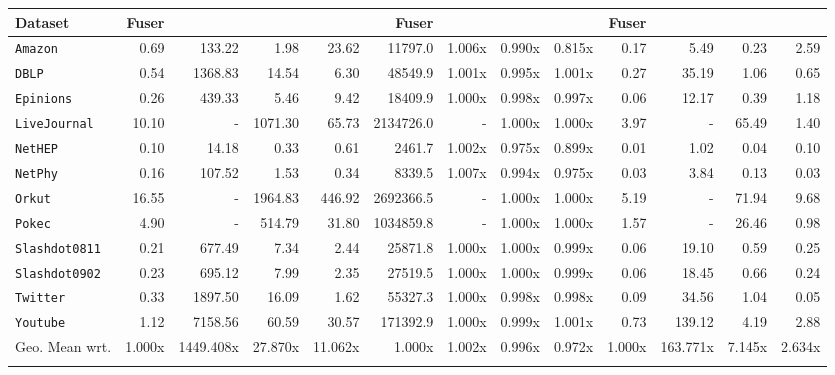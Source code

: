 \documentclass[10pt,journal,compsoc]{IEEEtran}
\newcommand\acro{{\sc{HyperFuseR\xspace}\xspace}\xspace}
\begin{document}
\begin{table}
{\begin{tabular}{l|rrrr|rrrr|rrrr}
Dataset      & {\sc Fuser} &         &         &         & {\sc Fuser} &         &         &         & {\sc Fuser} &       &       &      \\
\midrule
{\tt Amazon}       &       0.69 &  133.22 &    1.98 &  23.62 &    11797.0 &  1.006x &  0.990x &  0.815x &       0.17 &   5.49 &  0.23 & 2.59 \\
{\tt DBLP }         &       0.54 & 1368.83 &   14.54 &   6.30 &    48549.9 &  1.001x &  0.995x &  1.001x &       0.27 &  35.19 &  1.06 & 0.65 \\
{\tt Epinions }     &       0.26 &  439.33 &    5.46 &   9.42 &    18409.9 &  1.000x &  0.998x &  0.997x &       0.06 &  12.17 &  0.39 & 1.18 \\
{\tt LiveJournal }  &      10.10 &       - & 1071.30 &  65.73 &  2134726.0 &       - &  1.000x &  1.000x &       3.97 &      - & 65.49 & 1.40 \\
{\tt NetHEP }       &       0.10 &   14.18 &    0.33 &   0.61 &     2461.7 &  1.002x &  0.975x &  0.899x &       0.01 &   1.02 &  0.04 & 0.10 \\
{\tt NetPhy }       &       0.16 &  107.52 &    1.53 &   0.34 &     8339.5 &  1.007x &  0.994x &  0.975x &       0.03 &   3.84 &  0.13 & 0.03 \\
{\tt Orkut }        &      16.55 &       - & 1964.83 & 446.92 &  2692366.5 &       - &  1.000x &  1.000x &       5.19 &      - & 71.94 & 9.68 \\
{\tt Pokec }        &       4.90 &       - &  514.79 &  31.80 &  1034859.8 &       - &  1.000x &  1.000x &       1.57 &      - & 26.46 & 0.98 \\
{\tt Slashdot0811 } &       0.21 &  677.49 &    7.34 &   2.44 &    25871.8 &  1.000x &  1.000x &  0.999x &       0.06 &  19.10 &  0.59 & 0.25 \\
{\tt Slashdot0902 } &       0.23 &  695.12 &    7.99 &   2.35 &    27519.5 &  1.000x &  1.000x &  0.999x &       0.06 &  18.45 &  0.66 & 0.24 \\
{\tt Twitter }      &       0.33 & 1897.50 &   16.09 &   1.62 &    55327.3 &  1.000x &  0.998x &  0.998x &       0.09 &  34.56 &  1.04 & 0.05 \\
{\tt Youtube }      &       1.12 & 7158.56 &   60.59 &  30.57 &   171392.9 &  1.000x &  0.999x &  1.001x &       0.73 & 139.12 &  4.19 & 2.88 \\
\bottomrule
Geo. Mean wrt.&1.000x&1449.408x&27.870x&11.062x&1.000x&1.002x&0.996x&0.972x&1.000x&163.771x&7.145x&2.634x \\ \acro
\end{tabular}


    }
    \end{table}
    
\end{document}
